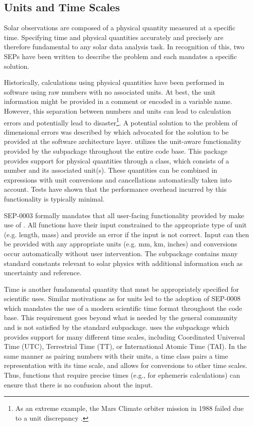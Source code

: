 \subsection{Units and Time Scales}
\label{sec:units}

Solar observations are composed of a physical quantity measured at a specific time.
Specifying time and physical quantities accurately and precisely are therefore fundamental to any solar data analysis task.
In recognition of this, two SEPs have been written to describe the problem and each mandates a specific solution.

Historically, calculations using physical quantities have been performed in software using raw numbers with no associated units.
At best, the unit information might be provided in a comment or encoded in a variable name.
However, this separation between numbers and units can lead to calculation errors and potentially lead to disaster\footnote{As an extreme example, the Mars Climate orbiter mission in 1988 failed due to a unit discrepancy \citep{mco_mishap_report}.}.
A potential solution to the problem of dimensional errors was described by \citet{Damevski2009} which advocated for the solution to be provided at the software architecture layer.
\sunpypkg utilizes the unit-aware functionality provided by the  subpackage throughout the entire code base.
This package provides support for physical quantities through a  class, which consists of a number and its associated unit(s).
These quantities can be combined in expressions with unit conversions and cancellations automatically taken into account.
Tests have shown that the performance overhead incurred by this functionality is typically minimal.

SEP-0003 \citep{sep-0003} formally mandates that all user-facing functionality provided by \sunpypkg make use of .
All functions have their input constrained to the appropriate type of unit (e.g. length, mass) and provide an error if the input is not correct.
Input can then be provided with any appropriate units (e.g. mm, km, inches) and conversions occur automatically without user intervention.
The  subpackage contains many standard constants relevant to solar physics with additional information such as uncertainty and reference.

Time is another fundamental quantity that must be appropriately specified for scientific uses.
Similar motivations as for units led to the adoption of SEP-0008 \citep{sep-0008} which mandates the use of a modern scientific time format throughout the \sunpypkg code base.
This requirement goes beyond what is needed by the general \python community and is not satisfied by the standard  subpackage.
\sunpypkg uses the  subpackage which provides support for many different time scales, including Coordinated Universal Time (UTC), Terrestrial Time (TT), or International Atomic Time (TAI).
In the same manner as pairing numbers with their units, a time class pairs a time representation with its time scale, and allows for conversions to other time scales.
Thus, functions that require precise times (e.g., for ephemeris calculations) can ensure that there is no confusion about the input.
